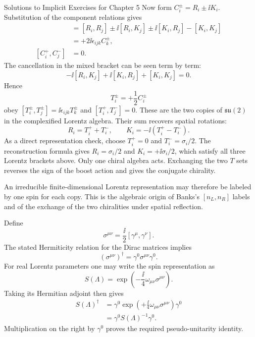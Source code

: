 \begin{bankssolutions}{Solutions to Implicit Exercises for Chapter 5}
Now form $C_i^\pm=R_i\pm\ii K_i$.  Substitution of the component relations
gives
\begin{align*}
  [C_i^\pm,C_j^\pm]
  &=[R_i,R_j]
    \mathbin{\pm}\ii[R_i,K_j]
    \mathbin{\pm}\ii[K_i,R_j]
    -[K_i,K_j]\\
  &=+2\ii\epsilon_{ijk}C_k^\pm,\\
  [C_i^+,C_j^-]&=0.
\end{align*}
The cancellation in the mixed bracket can be seen term by term:
\begin{equation*}
  [R_i,R_j]-\ii[R_i,K_j]
  +\ii[K_i,R_j]+[K_i,K_j]=0.
\end{equation*}
Hence
\begin{equation*}
  T_i^\pm=+\frac12C_i^\pm
\end{equation*}
obey
$[T_i^\pm,T_j^\pm]=\ii\epsilon_{ijk}T_k^\pm$ and
$[T_i^+,T_j^-]=0$.  These are the two copies of
$\mathfrak{su}(2)$ in the complexified Lorentz algebra.  Their sum recovers
spatial rotations:
\begin{equation*}
  R_i=T_i^++T_i^-,
  \qquad
  K_i=-\ii\left(T_i^+-T_i^-\right).
\end{equation*}
As a direct representation check, choose
$T_i^+=0$ and $T_i^-=\sigma_i/2$.  The reconstruction formula gives
$R_i=\sigma_i/2$ and $K_i=+\ii\sigma_i/2$, which satisfy all three Lorentz
brackets above.  Only one chiral algebra acts.  Exchanging the two $T$ sets
reverses the sign of the boost action and gives the conjugate chirality.

An irreducible finite-dimensional Lorentz representation may therefore be
labeled by one spin for each copy.  This is the algebraic origin of Banks's
$[n_L,n_R]$ labels and of the exchange of the two chiralities under spatial
reflection.

Define
\begin{equation*}
  \sigma^{\mu\nu}=\frac\ii2[\gamma^\mu,\gamma^\nu].
\end{equation*}
The stated Hermiticity relation for the Dirac matrices implies
\begin{equation*}
  (\sigma^{\mu\nu})^\dagger
  =\gamma^0\sigma^{\mu\nu}\gamma^0.
\end{equation*}
For real Lorentz parameters one may write the spin representation as
\begin{equation*}
  S(\Lambda)=
  \exp\left(-\frac\ii4\omega_{\mu\nu}\sigma^{\mu\nu}\right).
\end{equation*}
Taking its Hermitian adjoint then gives
\begin{align*}
  S(\Lambda)^\dagger
  &=\gamma^0
    \exp\left(+\frac\ii4\omega_{\mu\nu}\sigma^{\mu\nu}\right)
    \gamma^0\\
  &=\gamma^0S(\Lambda)^{-1}\gamma^0.
\end{align*}
Multiplication on the right by $\gamma^0$ proves the required
pseudo-unitarity identity.


\end{bankssolutions}
